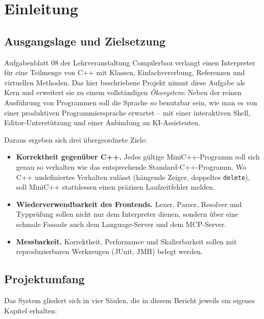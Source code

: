 \documentclass[11pt,a4paper,parskip=half,headsepline,toc=flat]{scrartcl}
\newcommand{\code}[1]{\texttt{#1}}
\begin{document}
\tableofcontents
\clearpage

\section{Einleitung}
\subsection{Ausgangslage und Zielsetzung}
Aufgabenblatt 08 der Lehrveranstaltung Compilerbau verlangt einen Interpreter für eine Teilmenge von C++ mit Klassen,
Einfachvererbung, Referenzen und virtuellen Methoden. Das hier beschriebene Projekt nimmt diese Aufgabe als Kern und
erweitert sie zu einem vollständigen \emph{Ökosystem}: Neben der reinen Ausführung von Programmen soll die Sprache so
benutzbar sein, wie man es von einer produktiven Programmiersprache erwartet -- mit einer interaktiven Shell,
Editor-Unterstützung und einer Anbindung an KI-Assistenten.

Daraus ergeben sich drei übergeordnete Ziele:
\begin{itemize}
  \item \textbf{Korrektheit gegenüber C++.} Jedes gültige MiniC++-Programm soll sich genau so verhalten wie das
    entsprechende Standard-C++-Programm. Wo C++ undefiniertes Verhalten zulässt (hängende Zeiger, doppeltes
    \code{delete}), soll MiniC++ stattdessen einen präzisen Laufzeitfehler melden.
  \item \textbf{Wiederverwendbarkeit des Frontends.} Lexer, Parser, Resolver und Typprüfung sollen nicht nur dem
    Interpreter dienen, sondern über eine schmale Fassade auch dem Language-Server und dem MCP-Server.
  \item \textbf{Messbarkeit.} Korrektheit, Performance und Skalierbarkeit sollen mit reproduzierbaren Werkzeugen
    (JUnit, JMH) belegt werden.
\end{itemize}

\subsection{Projektumfang}
Das System gliedert sich in vier Säulen, die in diesem Bericht jeweils ein eigenes Kapitel erhalten:
\end{document}
